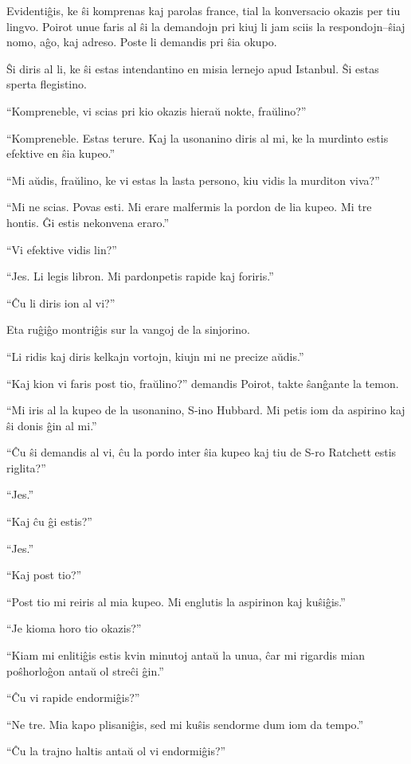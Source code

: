 Evidentiĝis, ke ŝi komprenas kaj parolas france, tial la konversacio okazis per tiu lingvo. Poirot unue faris al ŝi la demandojn pri kiuj li jam sciis la respondojn--ŝiaj nomo, aĝo, kaj adreso. Poste li demandis pri ŝia okupo.

Ŝi diris al li, ke ŝi estas intendantino en misia lernejo apud Istanbul. Ŝi estas sperta flegistino.

``Kompreneble, vi scias pri kio okazis hieraŭ nokte, fraŭlino?''

``Kompreneble. Estas terure. Kaj la usonanino diris al mi, ke la murdinto estis efektive en ŝia kupeo.''

``Mi aŭdis, fraŭlino, ke vi estas la lasta persono, kiu vidis la murditon viva?''

``Mi ne scias. Povas esti. Mi erare malfermis la pordon de lia kupeo. Mi tre hontis. Ĝi estis nekonvena eraro.''

``Vi efektive vidis lin?''

``Jes. Li legis libron. Mi pardonpetis rapide kaj foriris.''

``Ĉu li diris ion al vi?''

Eta ruĝiĝo montriĝis sur la vangoj de la sinjorino.

``Li ridis kaj diris kelkajn vortojn, kiujn mi ne precize aŭdis.''

``Kaj kion vi faris post tio, fraŭlino?'' demandis Poirot, takte ŝanĝante la temon.

``Mi iris al la kupeo de la usonanino, S-ino Hubbard. Mi petis iom da aspirino kaj ŝi donis ĝin al mi.''

``Ĉu ŝi demandis al vi, ĉu la pordo inter ŝia kupeo kaj tiu de S-ro Ratchett estis riglita?''

``Jes.''

``Kaj ĉu ĝi estis?''

``Jes.''

``Kaj post tio?''

``Post tio mi reiris al mia kupeo. Mi englutis la aspirinon kaj kuŝiĝis.''

``Je kioma horo tio okazis?''

``Kiam mi enlitiĝis estis kvin minutoj antaŭ la unua, ĉar mi rigardis mian poŝhorloĝon antaŭ ol streĉi ĝin.''

``Ĉu vi rapide endormiĝis?''

``Ne tre. Mia kapo plisaniĝis, sed mi kuŝis sendorme dum iom da tempo.''

``Ĉu la trajno haltis antaŭ ol vi endormiĝis?''

